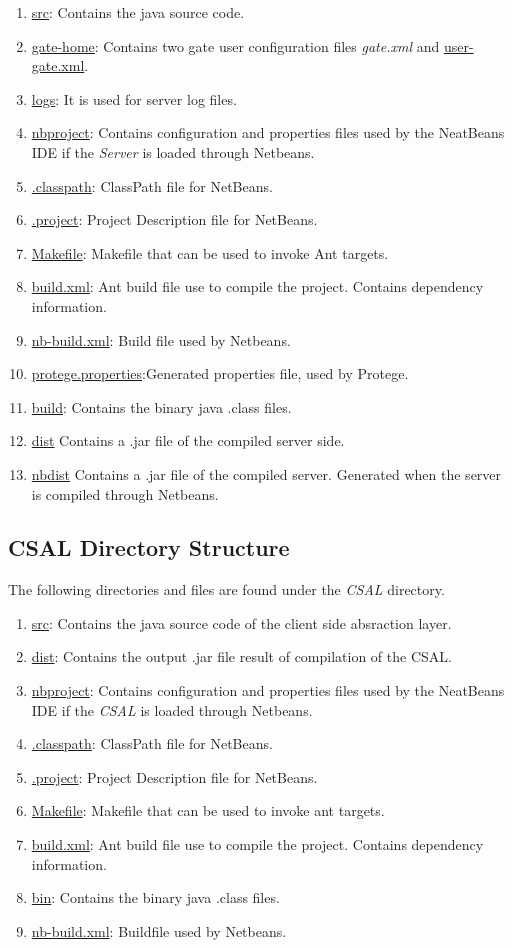 \begin{enumerate}
\item \url{src}: Contains the java source code.
\item \url{gate-home}: Contains two gate user configuration files \emph{gate.xml} and \url{user-gate.xml}.
\item \url{logs}: It is used for server log files.
\item \url{nbproject}: Contains configuration and properties files used by the NeatBeans IDE if the \emph{Server} is loaded through Netbeans.
\item \url{.classpath}: ClassPath file for NetBeans.
\item \url{.project}: Project Description file for NetBeans.
\item \url{Makefile}: Makefile that can be used to invoke Ant targets.
\item \url{build.xml}: Ant build file use to compile the project. Contains dependency information.
\item \url{nb-build.xml}: Build file used by Netbeans.
\item \url{protege.properties}:Generated properties file, used by Protege.
\item \url{build}: Contains the binary java .class files.
\item \url{dist} Contains a .jar file of the compiled server side.
\item \url{nbdist} Contains a .jar file of the compiled server. Generated when the server is compiled through Netbeans.
\end{enumerate}


\subsection{CSAL Directory Structure}
The following directories and files are found under the \emph{CSAL} directory.

\begin{enumerate}
\item \url{src}: Contains the java source code of the client side absraction layer.
\item \url{dist}: Contains the output .jar file result of compilation of the CSAL.
\item \url{nbproject}: Contains configuration and properties files used by the NeatBeans IDE if the \emph{CSAL} is loaded through Netbeans.
\item \url{.classpath}: ClassPath file for NetBeans.
\item \url{.project}: Project Description file for NetBeans.
\item \url{Makefile}: Makefile that can be used to invoke ant targets.
\item \url{build.xml}: Ant build file use to compile the project. Contains dependency information.
\item \url{bin}: Contains the binary java .class files.
\item \url{nb-build.xml}: Buildfile used by Netbeans.
\end{enumerate}


